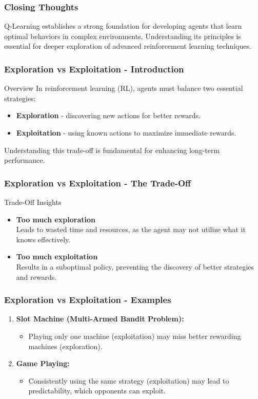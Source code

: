 \documentclass[aspectratio=169]{beamer}
\begin{document}
\begin{frame}[fragile]
    \frametitle{Closing Thoughts}
    Q-Learning establishes a strong foundation for developing agents that learn optimal behaviors in complex environments. Understanding its principles is essential for deeper exploration of advanced reinforcement learning techniques.
\end{frame}

\begin{frame}[fragile]
  \frametitle{Exploration vs Exploitation - Introduction}
  \begin{block}{Overview}
  In reinforcement learning (RL), agents must balance two essential strategies:
  \begin{itemize}
    \item \textbf{Exploration} - discovering new actions for better rewards.
    \item \textbf{Exploitation} - using known actions to maximize immediate rewards.
  \end{itemize}
  Understanding this trade-off is fundamental for enhancing long-term performance.
  \end{block}
\end{frame}

\begin{frame}[fragile]
  \frametitle{Exploration vs Exploitation - The Trade-Off}
  \begin{block}{Trade-Off Insights}
  \begin{itemize}
    \item \textbf{Too much exploration} \\
    Leads to wasted time and resources, as the agent may not utilize what it knows effectively.
    
    \item \textbf{Too much exploitation} \\
    Results in a suboptimal policy, preventing the discovery of better strategies and rewards.
  \end{itemize}
  \end{block}
\end{frame}

\begin{frame}[fragile]
  \frametitle{Exploration vs Exploitation - Examples}
  \begin{enumerate}
    \item \textbf{Slot Machine (Multi-Armed Bandit Problem):}
      \begin{itemize}
        \item Playing only one machine (exploitation) may miss better rewarding machines (exploration).
      \end{itemize}
      
    \item \textbf{Game Playing:}
      \begin{itemize}
        \item Consistently using the same strategy (exploitation) may lead to predictability, which opponents can exploit.
      \end{itemize}
  \end{enumerate}
\end{frame}
\end{document}
